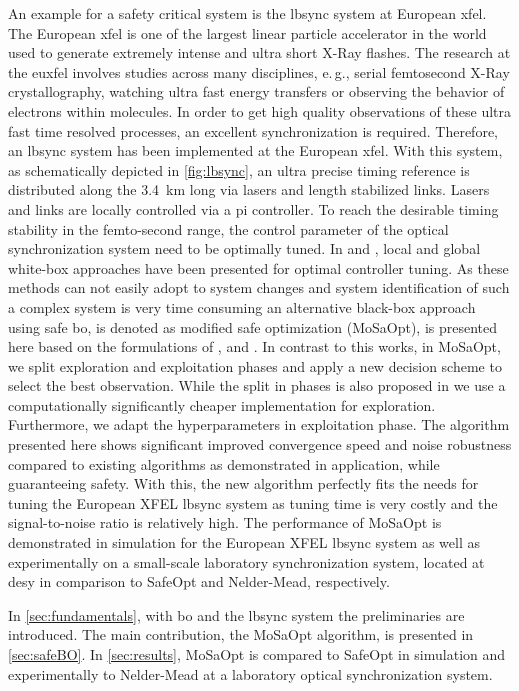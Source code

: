 \documentclass{ifacconf}
\newcounter{part}
\newcommand{\eg}{e.\,g., }
\begin{document}
An example for a safety critical system is the \gls{lbsync} system at European \gls{xfel}.
The European \gls{xfel} is one of the largest linear particle accelerator in the world used to generate extremely intense and ultra short X-Ray flashes. The research at the \gls{euxfel} involves studies across many disciplines, \eg serial femtosecond X-Ray crystallography, watching ultra fast energy transfers or observing the behavior of electrons within molecules. In order to get high quality observations of these ultra fast time resolved processes, an excellent synchronization is required. Therefore, an \gls{lbsync} system has been implemented at the European \gls{xfel}. With this system, as schematically depicted in \cref{fig:lbsync}, an ultra precise timing reference is distributed along the \SI{3.4}{\kilo\meter} long via lasers and length stabilized links. Lasers and links are locally controlled via a \gls{pi} controller. To reach the desirable timing stability in the femto-second range, the control parameter of the optical synchronization system need to be optimally tuned. In \cite{heuer} and \cite{whitebox_max}, local and global white-box approaches have been presented for optimal controller tuning. As these methods can not easily adopt to system changes and system identification of such a complex system is very time consuming an alternative black-box approach using safe \gls{bo}, is denoted as modified safe optimization (MoSaOpt), is presented here based on the formulations of \cite{lineBO}, \cite{safeopt1} and \cite{safeoptberkenkamp}. In contrast to this works, in MoSaOpt, we split exploration and exploitation phases and apply a new decision scheme to select the best observation. While the split in phases is also proposed in \cite{stageopt} we use a computationally significantly cheaper implementation for exploration. Furthermore, we adapt the hyperparameters in exploitation phase. The algorithm presented here shows significant improved convergence speed and noise robustness compared to existing algorithms as demonstrated in application, while guaranteeing safety. With this, the new algorithm perfectly fits the needs for tuning the European XFEL \gls{lbsync} system as tuning time is very costly and the signal-to-noise ratio is relatively high.
The performance of MoSaOpt is demonstrated in simulation for the European XFEL \gls{lbsync} system as well as experimentally on a small-scale laboratory synchronization system, located at \gls{desy} in comparison to SafeOpt and Nelder-Mead, respectively. 

In \cref{sec:fundamentals}, with \gls{bo} and the \gls{lbsync} system the preliminaries are introduced. The main contribution, the MoSaOpt algorithm, is presented in \cref{sec:safeBO}. In \cref{sec:results}, MoSaOpt is compared to SafeOpt in simulation and experimentally to Nelder-Mead at a laboratory optical synchronization system.
\end{document}
